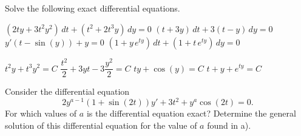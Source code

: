 \begin{Exercise}Solve the following exact differential equations.
    \begin{multicols}{2}
    \Question $\left( 2 t y + 3 t^2 y^2 \right) \, dt + \left( t^2 + 2 t^3 y \right) \, dy = 0 $
    \Question $\left( t + 3 y \right)\, d t + 3 \left( t - y \right)\, d y = 0$
    \Question $ y' \left( t - \sin(y) \right) + y = 0 $
    \Question $\left( 1 + y\, e^{ty} \right) \, dt + \left( 1 + t\, e^{ty} \right)\, dy = 0$
    \EndCurrentQuestion
    \end{multicols}
\end{Exercise}

\begin{Answer}
    \begin{multicols}{2}
    \Question $t^2y+t^3y^2 = C$ %
    \Question $\dfrac{t^2}{2} +3yt-3\dfrac{y^2}{2} = C$ %
    \Question $ty + \cos (y) = C$
    \Question $t+y+e^{ty}=C$
    \EndCurrentQuestion
    \end{multicols}
\end{Answer}


\begin{Exercise}Consider the differential equation
\[ 2y^{a-1}\left(1+\sin(2t)\right)y' + 3t^2+y^a\cos(2t)=0.\]
	\Question For which values of $a$ is the differential equation exact?
	\Question Determine the general solution of this differential equation for the value of $a$ found in a).
\end{Exercise}


